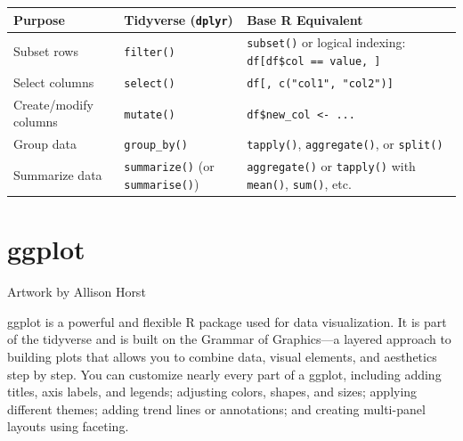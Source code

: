 \documentclass[
]{book}
\begin{document}
\begin{longtable}[]{@{}
  >{\raggedright\arraybackslash}p{}
  >{\raggedright\arraybackslash}p{}
  >{\raggedright\arraybackslash}p{}@{}}
\toprule\noalign{}
\begin{minipage}[b]{\linewidth}\raggedright
\textbf{Purpose}
\end{minipage} & \begin{minipage}[b]{\linewidth}\raggedright
\textbf{Tidyverse (\texttt{dplyr})}
\end{minipage} & \begin{minipage}[b]{\linewidth}\raggedright
\textbf{Base R Equivalent}
\end{minipage} \\
\midrule\noalign{}
\endhead
\bottomrule\noalign{}
\endlastfoot
Subset rows & \texttt{filter()} & \texttt{subset()} or logical indexing: \texttt{df{[}df\$col\ ==\ value,\ {]}} \\
Select columns & \texttt{select()} & \texttt{df{[},\ c("col1",\ "col2"){]}} \\
Create/modify columns & \texttt{mutate()} & \texttt{df\$new\_col\ \textless{}-\ ...} \\
Group data & \texttt{group\_by()} & \texttt{tapply()}, \texttt{aggregate()}, or \texttt{split()} \\
Summarize data & \texttt{summarize()} (or \texttt{summarise()}) & \texttt{aggregate()} or \texttt{tapply()} with \texttt{mean()}, \texttt{sum()}, etc. \\
\end{longtable}

\section{ggplot}\label{ggplot}

Artwork by Allison Horst

ggplot is a powerful and flexible R package used for data visualization. It is part of the tidyverse and is built on the Grammar of Graphics---a layered approach to building plots that allows you to combine data, visual elements, and aesthetics step by step. You can customize nearly every part of a ggplot, including adding titles, axis labels, and legends; adjusting colors, shapes, and sizes; applying different themes; adding trend lines or annotations; and creating multi-panel layouts using faceting.
\end{document}
